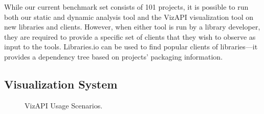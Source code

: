 While our current benchmark set consists of 101 projects, it is possible to run both our static and dynamic analysis tool and the VizAPI visualization tool on new libraries and clients. However, when either tool is run by a library developer, they are required to provide a specific set of clients that they wish to observe as input to the tools. Libraries.io can be used to find popular clients of libraries---it provides a dependency tree based on projects' packaging information.


\subsection{Visualization System}
\label{subsec:vis-system}

\begin{figure}[h]
\begin{center}

\hspace{7mm}

\caption{\label{fig:usagescenarios} VizAPI Usage Scenarios.}

\end{center}
\end{figure}


